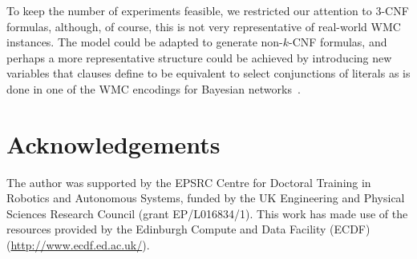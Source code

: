 \documentclass{article}
\theoremstyle{definition}
\begin{document}
To keep the number of experiments feasible, we restricted our attention to 3-CNF
formulas, although, of course, this is not very representative of real-world
\textsf{WMC} instances. The model could be adapted to generate non-$k$-CNF
formulas, and perhaps a more representative structure could be achieved by
introducing new variables that clauses define to be equivalent to select
conjunctions of literals as is done in one of the \textsf{WMC} encodings for
Bayesian networks~\cite{DBLP:conf/kr/Darwiche02}.


\section*{Acknowledgements}

The author was supported by the EPSRC Centre for Doctoral Training in Robotics and Autonomous Systems, funded by the UK Engineering and Physical Sciences Research Council (grant EP/L016834/1). This work has made use of the resources provided by the Edinburgh Compute and Data Facility (ECDF) (\url{http://www.ecdf.ed.ac.uk/}).

\appendix



\end{document}
